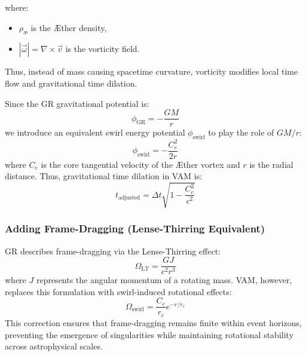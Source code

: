 \documentclass[a4paper,10pt]{article}
\begin{document}
where:
\begin{itemize}
    \item $\rho_\text{\ae}$ is the Æther density,
    \item $|\vec{\omega}| = \nabla \times \vec{v}$ is the vorticity field.
\end{itemize}
Thus, instead of mass causing spacetime curvature, vorticity modifies local time flow and gravitational time dilation.

Since the GR gravitational potential is:
\begin{equation*}
    \phi_\text{GR} = -\frac{GM}{r}
\end{equation*}
we introduce an equivalent swirl energy potential $\phi_\text{swirl}$ to play the role of $GM/r$:
\begin{equation*}
    \phi_\text{swirl} = -\frac{C_e^2}{2r}
\end{equation*}
where $C_e$ is the core tangential velocity of the Æther vortex and $r$ is the radial distance. Thus, gravitational time dilation in VAM is:
\begin{equation*}
    t_\text{adjusted} = \Delta t \sqrt{1 - \frac{C_e^2}{c^2}}
\end{equation*}

\subsubsection*{Adding Frame-Dragging (Lense-Thirring Equivalent)}
GR describes frame-dragging via the Lense-Thirring effect:
\begin{equation*}
    \Omega_\text{LT} = \frac{GJ}{c^2 r^3}
\end{equation*}
where $J$ represents the angular momentum of a rotating mass. VAM, however, replaces this formulation with swirl-induced rotational effects:
\begin{equation*}
    \Omega_\text{swirl} = \frac{C_e}{r_c} e^{-r/r_c}
\end{equation*}
This correction ensures that frame-dragging remains finite within event horizons, preventing the emergence of singularities while maintaining rotational stability across astrophysical scales.
\end{document}
